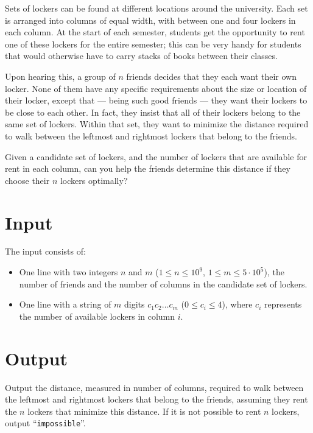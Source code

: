 
%
Sets of lockers can be found at different locations around the university. Each
set is arranged into columns of equal width, with between one and four lockers
in each column. At the start of each semester, students get the opportunity to
rent one of these lockers for the entire semester; this can be very handy for
students that would otherwise have to carry stacks of books between their
classes.

Upon hearing this, a group of $n$ friends decides that they each want their own
locker. None of them have any specific requirements about the size or location
of their locker, except that --- being such good friends --- they want their
lockers to be close to each other. In fact, they insist that all of their
lockers belong to the same set of lockers. Within that set, they want to
minimize the distance required to walk between the leftmost and rightmost
lockers that belong to the friends.

Given a candidate set of lockers, and the number of lockers that are available
for rent in each column, can you help the friends determine this distance if
they choose their $n$ lockers optimally?

\section*{Input}
The input consists of:
\begin{itemize}
    \item One line with two integers $n$ and $m$ ($1 \le n \le 10^9$, $1 \le m \le
    5\cdot 10^5$), the number of friends and the number of columns in the
    candidate set of lockers.
    \item One line with a string of $m$ digits $c_1c_2\ldots c_m$ ($0 \le c_i
    \le 4$), where $c_i$ represents the number of available lockers in column
    $i$.
\end{itemize}

\section*{Output}
Output the distance, measured in number of columns, required to walk between
the leftmost and rightmost lockers that belong to the friends, assuming they
rent the $n$ lockers that minimize this distance. If it is not possible to rent
$n$ lockers, output ``\texttt{impossible}''.

